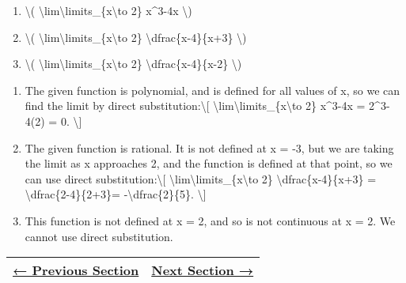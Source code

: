 \begin{enumerate}
\tightlist
\item
  \textbackslash{}(
  \textbackslash{}lim\textbackslash{}limits\_\{x\textbackslash{}to 2\}
  x\^{}3-4x \textbackslash{})
\item
  \textbackslash{}(
  \textbackslash{}lim\textbackslash{}limits\_\{x\textbackslash{}to 2\}
  \textbackslash{}dfrac\{x-4\}\{x+3\} \textbackslash{})
\item
  \textbackslash{}(
  \textbackslash{}lim\textbackslash{}limits\_\{x\textbackslash{}to 2\}
  \textbackslash{}dfrac\{x-4\}\{x-2\} \textbackslash{})
\end{enumerate}

\begin{enumerate}
\tightlist
\item
  The given function is polynomial, and is defined for all values of x,
  so we can find the limit by direct substitution:\textbackslash{}{[}
  \textbackslash{}lim\textbackslash{}limits\_\{x\textbackslash{}to 2\}
  x\^{}3-4x = 2\^{}3-4(2) = 0. \textbackslash{}{]}
\item
  The given function is rational. It is not defined at x = -3, but we
  are taking the limit as x approaches 2, and the function is defined at
  that point, so we can use direct substitution:\textbackslash{}{[}
  \textbackslash{}lim\textbackslash{}limits\_\{x\textbackslash{}to 2\}
  \textbackslash{}dfrac\{x-4\}\{x+3\} =
  \textbackslash{}dfrac\{2-4\}\{2+3\}= -\textbackslash{}dfrac\{2\}\{5\}.
  \textbackslash{}{]}
\item
  This function is not defined at x = 2, and so is not continuous at x =
  2. We cannot use direct substitution.
\end{enumerate}

\begin{longtable}[]{@{}ll@{}}
\toprule
\endhead
\href{../chapter1/section1-8.php}{← Previous Section} &
\href{section2-2.php}{Next Section →}\tabularnewline
\bottomrule
\end{longtable}
